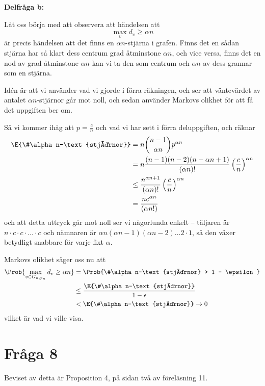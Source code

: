 \documentclass[nobib]{tufte-handout}
\begin{document}
\noindent\textbf{Delfråga b:}

Låt oss börja med att observera att händelsen att
$$\max_v d_v \geq \alpha n$$
är precis händelsen att det finns en $\alpha n$-stjärna i grafen. Finns det en sådan stjärna har så klart dess centrum grad åtminstone $\alpha n$, och vice versa, finns det en nod av grad åtminstone $\alpha n$ kan vi ta den som centrum och $\alpha n$ av dess grannar som en stjärna.

Idén är att vi använder vad vi gjorde i förra räkningen, och ser att väntevärdet av antalet $\alpha n$-stjärnor går mot noll, och sedan använder Markovs olikhet för att få det uppgiften ber om.

Så vi kommer ihåg att $p = \frac{c}{n}$ och vad vi har sett i förra deluppgiften, och räknar
\begin{align*}
  \E{\#\alpha n-\text{stjärnor}} &= n \binom{n-1}{\alpha n}p^{\alpha n}\\
  &= n \frac{(n-1)(n-2)(n - \alpha n + 1)}{(\alpha n)!} \left(\frac{c}{n}\right)^{\alpha n}\\
  &\leq \frac{n^{\alpha n + 1}}{(\alpha n)!}\left(\frac{c}{n}\right)^{\alpha n}\\
  &= \frac{n c^{\alpha n}}{(\alpha n!)}
\end{align*}
och att detta uttryck går mot noll ser vi någorlunda enkelt -- täljaren är $n\cdot c \cdot c\cdot\ldots\cdot c$ och nämnaren är $\alpha n(\alpha n - 1)(\alpha n - 2)\ldots2\cdot1$, så den växer betydligt snabbare för varje fixt $\alpha$.

Markovs olikhet säger oss nu att
\begin{align*}
  \Prob{\max_{v \in G_{n,p_n}} d_v \geq \alpha n} &= \Prob{\#\alpha n-\text{stjärnor} > 1 - \epsilon}\\
  &\leq \frac{\E{\#\alpha n-\text{stjärnor}}}{1 - \epsilon}\\
  &< \E{\#\alpha n-\text{stjärnor}} \to 0
\end{align*}
vilket är vad vi ville visa.

\section{Fråga 8}

Beviset av detta är Proposition 4, på sidan två av föreläsning 11.

%
%
\end{document}
